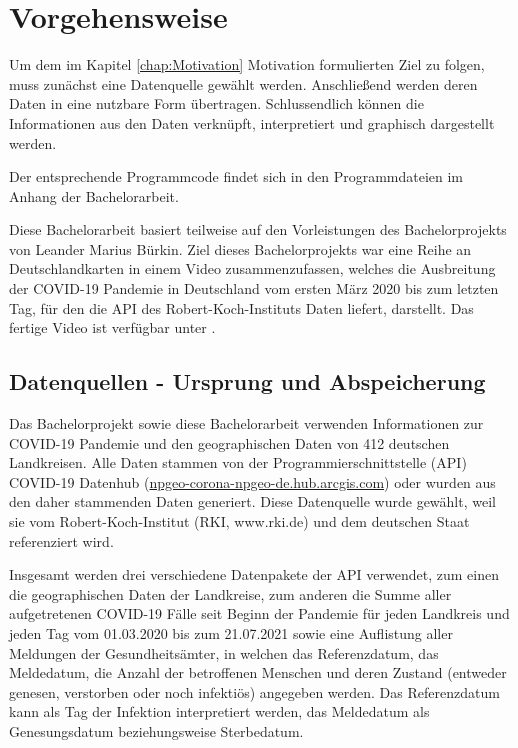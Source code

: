 \chapter{Vorgehensweise}\label{chap:Vorgehensweise}
Um dem im Kapitel \glqq{}\ref{chap:Motivation} Motivation\grqq{} formulierten Ziel zu folgen, muss zunächst eine Datenquelle gewählt werden.
Anschließend werden deren Daten in eine nutzbare Form übertragen.
Schlussendlich können die Informationen aus den Daten verknüpft, interpretiert und graphisch dargestellt werden.

Der entsprechende Programmcode findet sich in den Programmdateien im Anhang der Bachelorarbeit. 

Diese Bachelorarbeit basiert teilweise auf den Vorleistungen des Bachelorprojekts von Leander Marius Bürkin.
Ziel dieses Bachelorprojekts war eine Reihe an Deutschlandkarten in einem Video zusammenzufassen, welches die Ausbreitung der COVID-19 Pandemie in Deutschland vom ersten März 2020 bis zum letzten Tag, für den die API des Robert-Koch-Instituts Daten liefert, darstellt.
Das fertige Video ist verfügbar unter .

\section{Datenquellen - Ursprung und Abspeicherung}\label{sec:Datenquelle}

Das Bachelorprojekt sowie diese Bachelorarbeit verwenden Informationen zur COVID-19 Pandemie und den geographischen Daten von 412 deutschen Landkreisen. Alle Daten stammen von der Programmierschnittstelle (API) \glqq{}COVID-19 Datenhub\grqq{}
(\href{npgeo-corona-npgeo-de.hub.arcgis.com}{npgeo-corona-npgeo-de.hub.arcgis.com}) oder wurden aus den daher stammenden Daten generiert. Diese Datenquelle wurde gewählt, weil sie vom Robert-Koch-Institut (RKI, www.rki.de) und dem deutschen Staat referenziert wird.



Insgesamt werden drei verschiedene Datenpakete der API verwendet, zum einen die geographischen Daten der Landkreise, zum anderen die Summe aller aufgetretenen COVID-19 Fälle seit Beginn der Pandemie für jeden Landkreis und jeden Tag vom 01.03.2020 bis zum 21.07.2021 sowie eine Auflistung aller Meldungen der Gesundheitsämter, in welchen das  Referenzdatum, das Meldedatum, die Anzahl der betroffenen Menschen und deren Zustand (entweder genesen, verstorben oder noch infektiös) angegeben werden. Das Referenzdatum kann als Tag der Infektion interpretiert werden, das Meldedatum als Genesungsdatum beziehungsweise Sterbedatum.

